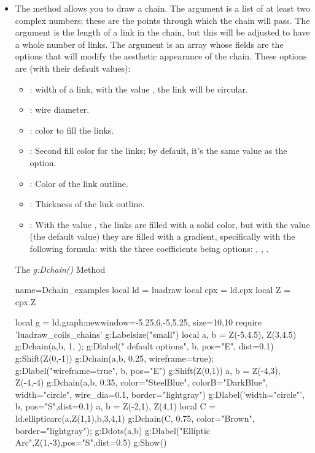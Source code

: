 \begin{itemize}
    \item The  method allows you to draw a chain. The  argument is a list of at least two complex numbers; these are the points through which the chain will pass. The  argument is the length of a link in the chain, but this will be adjusted to have a whole number of links.
    The  argument is an array whose fields are the options that will modify the aesthetic appearance of the chain. These options are (with their default values):
    \begin{itemize}
        \item {} : width of a link, with the value , the link will be circular.
        \item {}: wire diameter.
        \item {}: color to fill the links.
        \item {}: Second fill color for the links; by default, it's the same value as the  option.
        \item {}: Color of the link outline.
        \item {}: Thickness of the link outline. \item {}: With the value \true, the links are filled with a solid color, but with the value \false (the default value) they are filled with a gradient, specifically with the following formula:
        with the three coefficients being options: , , .
    \end{itemize}

\begin{demo}{The \emph{g:Dchain()} Method}
\begin{luadraw}{name=Dchain_examples}
local ld = luadraw
local cpx = ld.cpx
local Z = cpx.Z

local g = ld.graph:new{window={-5.25,6,-5,5.25}, size={10,10}}
require 'luadraw_coils_chains'
g:Labelsize("small")
local a, b = Z(-5,4.5), Z(3,4.5)
g:Dchain({a,b}, 1, {}); g:Dlabel(" default options", b, {pos="E", dist=0.1})
g:Shift(Z(0,-1))
g:Dchain({a,b}, 0.25, {wireframe=true}); g:Dlabel("wireframe=true", b, {pos="E"})
g:Shift(Z(0,1))
a, b = Z(-4,3), Z(-4,-4)
g:Dchain({a,b}, 0.35, {color="SteelBlue", colorB="DarkBlue", width="circle", wire_dia=0.1, border="lightgray"})
g:Dlabel('width="circle"', b, {pos="S",dist=0.1})
a, b = Z(-2,1), Z(4,1)
local C = ld.ellipticarc(a,Z(1,1),b,3,4,1)
g:Dchain(C, 0.75, {color="Brown", border="lightgray"}); g:Ddots({a,b})
g:Dlabel("Elliptic Arc",Z(1,-3),{pos="S",dist=0.5})
g:Show()
\end{luadraw}
\end{demo}


\end{itemize}
